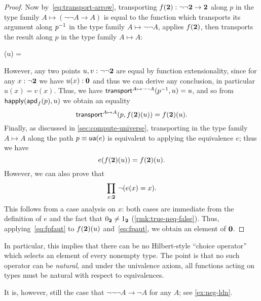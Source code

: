 \begin{proof}
  Now by~\eqref{eq:transport-arrow}, transporting $f(\mathbf{2}):\neg\neg\mathbf{2}\to\mathbf{2}$ along $p$ in the type family ${A\mapsto (\neg\neg A \to A)}$ is equal to the function which transports its argument along $\mathord{{p}^{-1}}$ in the type family $A\mapsto \neg\neg A$, applies $f(\mathbf{2})$, then transports the result along $p$ in the type family $A\mapsto A$:
  \begin{narrowmultline*}
    (u) =
    \narrowbreak
  \end{narrowmultline*}
  However, any two points $u,v:\neg\neg\mathbf{2}$ are equal by function extensionality, since for any $x:\neg\mathbf{2}$ we have $u(x):\mathbf{0}$ and thus we can derive any conclusion, in particular $u(x)=v(x)$.
  Thus, we have $\mathsf{transport}^{A\mapsto \neg\neg A}(\mathord{{p}^{-1}},u) = u$, and so from $\mathsf{happly}(\mathsf{apd}_{f}\mathopen{}\left(p\right)\mathclose{},u)$ we obtain an equality
  \[ \mathsf{transport}^{A\mapsto A}(p,f(\mathbf{2})(u)) = f(\mathbf{2})(u).\]
  Finally, as discussed in \autoref{sec:compute-universe}, transporting in the type family $A\mapsto A$ along the path $p\equiv \mathsf{ua}(e)$ is equivalent to applying the equivalence $e$; thus we have
  \begin{equation}
    e(f(\bool)(u)) = f(\bool)(u).\label{eq:fpaut}
  \end{equation}
  However, we can also prove that
  \begin{equation}
    \prd{x:\bool} \neg(e(x)=x).\label{eq:fpfaut}
  \end{equation}
  This follows from a case analysis on $x$: both cases are immediate from the definition of $e$ and the fact that ${0_{\mathbf{2}}}\neq{1_{\ensuremath{\mathbf{2}}}}$ (\autoref{rmk:true-neq-false}).
  Thus, applying~\eqref{eq:fpfaut} to $f(\mathbf{2})(u)$ and~\eqref{eq:fpaut}, we obtain an element of $\mathbf{0}$.
\end{proof}

\begin{rmk}
  In particular, this implies that there can be no Hilbert-style ``choice operator'' which selects an element of every nonempty type.
  The point is that no such operator can be \emph{natural}, and under the univalence axiom, all functions acting on types must be natural with respect to equivalences.
\end{rmk}

\begin{rmk}
  It is, however, still the case that $\neg\neg\neg A \to \neg A$ for any $A$; see \autoref{ex:neg-ldn}.
\end{rmk}

